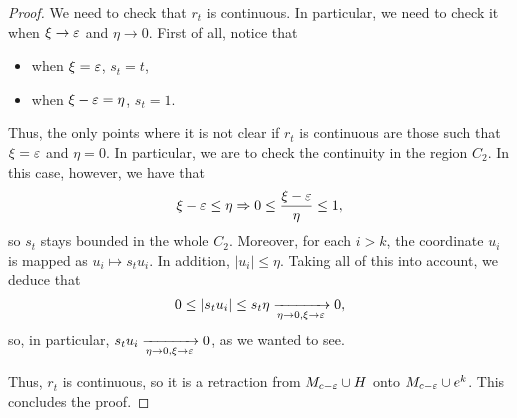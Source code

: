 \begin{proof}
We need to check that $r_t$ is continuous. In particular, we need to check it when $\xi \rightarrow \varepsilon$ and $\eta \rightarrow 0$. First of all, notice that

\begin{itemize}
	\item when $\xi = \varepsilon$, $s_t = t$,
	\item when $\xi - \varepsilon = \eta$, $s_t = 1$.
\end{itemize}

Thus, the only points where it is not clear if $r_t$ is continuous are those such that $\xi = \varepsilon$ and $\eta = 0$. In particular, we are to check the continuity in the region $C_2$. In this case, however, we have that
$$\xi - \varepsilon \leq \eta \Rightarrow 0 \leq \frac{\xi - \varepsilon}{\eta} \leq 1,$$
so $s_t$ stays bounded in the whole $C_2$. Moreover, for each $i > k$, the coordinate $u_i$ is mapped as $u_i \mapsto s_t u_i$. In addition, $|u_i| \leq \eta$. Taking all of this into account, we deduce that
$$0 \leq |s_tu_i| \leq s_t\eta \xrightarrow[\eta \rightarrow 0, \xi \rightarrow \varepsilon]{} 0 ,$$
so, in particular, $s_tu_i \xrightarrow[\eta \rightarrow 0, \xi \rightarrow \varepsilon]{} 0$, as we wanted to see.

Thus, $r_t$ is continuous, so it is a retraction from $M_{c-\varepsilon} \cup H$ onto $M_{c-\varepsilon} \cup e^k$. This concludes the proof.
\end{proof}
